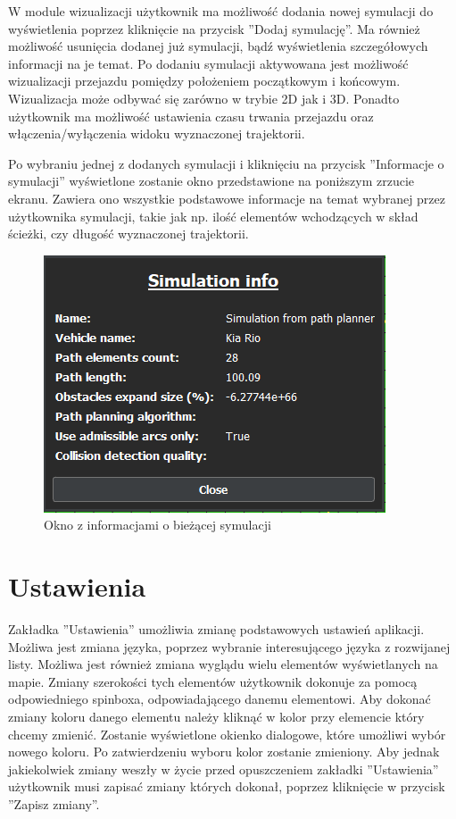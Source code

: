 \documentclass[a4paper,11pt,twoside]{report}
\theoremstyle{definition}
\begin{document}
W module wizualizacji użytkownik ma możliwość dodania nowej symulacji do wyświetlenia poprzez kliknięcie na przycisk ''Dodaj symulację''. Ma również możliwość usunięcia dodanej już symulacji, bądź wyświetlenia szczegółowych informacji na je temat. Po dodaniu symulacji aktywowana jest możliwość wizualizacji przejazdu pomiędzy położeniem początkowym i końcowym. Wizualizacja może odbywać się zarówno w trybie 2D jak i 3D. Ponadto użytkownik ma możliwość ustawienia czasu trwania przejazdu oraz włączenia/wyłączenia widoku wyznaczonej trajektorii.

Po wybraniu jednej z dodanych symulacji i kliknięciu na przycisk ''Informacje o symulacji'' wyświetlone zostanie okno przedstawione na poniższym zrzucie ekranu. Zawiera ono wszystkie podstawowe informacje na temat wybranej przez użytkownika symulacji, takie jak np. ilość elementów wchodzących w skład ścieżki, czy długość wyznaczonej trajektorii.

\begin{figure}[h!]
\centering
\includegraphics[scale=1.0]{instructionSimulationInfo}
\caption[Okno z informacjami o bieżącej symulacji]{Okno z informacjami o bieżącej symulacji}
\end{figure}

\section{Ustawienia}

Zakładka ''Ustawienia'' umożliwia zmianę podstawowych ustawień aplikacji. Możliwa jest zmiana języka, poprzez wybranie interesującego języka z rozwijanej listy. Możliwa jest również zmiana wyglądu wielu elementów wyświetlanych na mapie. Zmiany szerokości tych elementów użytkownik dokonuje za pomocą odpowiedniego spinboxa, odpowiadającego danemu elementowi. Aby dokonać zmiany koloru danego elementu należy kliknąć w kolor przy elemencie który chcemy zmienić. Zostanie wyświetlone okienko dialogowe, które umożliwi wybór nowego koloru. Po zatwierdzeniu wyboru kolor zostanie zmieniony. Aby jednak jakiekolwiek zmiany weszły w życie przed opuszczeniem zakładki ''Ustawienia'' użytkownik musi zapisać zmiany których dokonał, poprzez kliknięcie w przycisk ''Zapisz zmiany''. 
\end{document}
